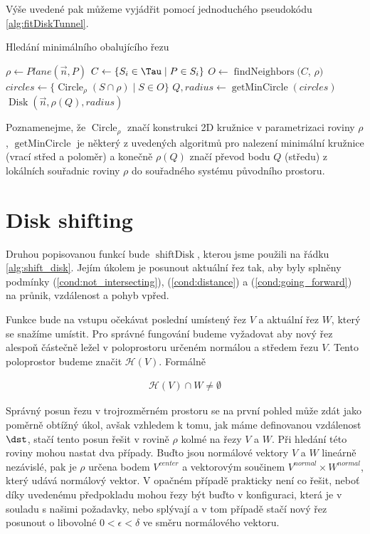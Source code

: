 Výše uvedené pak můžeme vyjádřit pomocí jednoduchého pseudokódu \ref{alg:fitDiskTunnel}.

\begin{algorithm}
\caption{Hledání minimálního obalujícího řezu}
\label{alg:fitDiskTunnel}
\begin{algorithmic}[1]

    \State $ \rho \gets Plane(\vec{n}, P) $
    \State $ C \gets \{S_i \in \Tau \mid P \in S_i \} $
    \State $ O \gets \operatorname{findNeighbors}(C$, $\rho)$
    \State $ circles \gets \{ \operatorname{Circle}_{\rho}(S \cap \rho) \mid S \in O \} $
    \State $ Q, radius \gets \operatorname{getMinCircle}(circles) $
    \State \Return $ \operatorname{Disk}(\vec{n}, \rho(Q), radius) $
\EndFunction

\end{algorithmic}
\end{algorithm}
Poznamenejme, že $ \operatorname{Circle}_{\rho} $ značí konstrukci 2D kružnice
v parametrizaci roviny $ \rho $, $ \operatorname{getMinCircle} $ je některý z
uvedených algoritmů pro nalezení minimální kružnice (vrací střed a poloměr)
a konečně $ \rho(Q) $ značí převod bodu $ Q $ (středu) z lokálních souřadnic
roviny $ \rho $ do souřadného systému původního prostoru.



\section{Disk shifting} \label{subsec:disk_shift}
Druhou popisovanou funkcí bude $ \operatorname{shiftDisk} $, kterou jsme použili
na řádku \ref{alg:shift_disk}. Jejím úkolem je posunout aktuální řez tak, aby
byly splněny podmínky (\ref{cond:not_intersecting}), (\ref{cond:distance})
a (\ref{cond:going_forward}) na průnik, vzdálenost a pohyb vpřed.

Funkce bude na vstupu očekávat poslední umístený řez $ V $ a aktuální řez $ W $,
který se snažíme umístit. Pro správné fungování budeme vyžadovat aby nový řez
alespoň částečně ležel v poloprostoru určeném normálou a středem řezu $ V $.
Tento poloprostor budeme značit $ \mathcal{H}(V) $. Formálně

\begin{align} \label{cond:halfspace}
    \mathcal{H}(V) \cap W \neq \emptyset
\end{align}

Správný posun řezu v trojrozměrném prostoru se na první pohled může zdát jako
poměrně obtížný úkol, avšak vzhledem k tomu, jak máme definovanou vzdálenost $ \dst $,
stačí tento posun řešit v rovině $ \rho $ kolmé na řezy $ V $ a $ W $. Při hledání této
roviny mohou nastat dva případy. Buďto jsou normálové vektory $ V $ a $ W $ lineárně
nezávislé, pak je $ \rho $ určena bodem $ V^{center} $ a vektorovým součinem
$ V^{normal} \times W^{normal} $, který udává normálový vektor. V opačném případě
prakticky není co řešit, neboť díky uvedenému předpokladu mohou řezy být buďto
v konfiguraci, která je v souladu s našimi požadavky, nebo splývají a v tom
případě stačí nový řez posunout o libovolné $ 0 < \epsilon < \delta $ ve směru
normálového vektoru.


